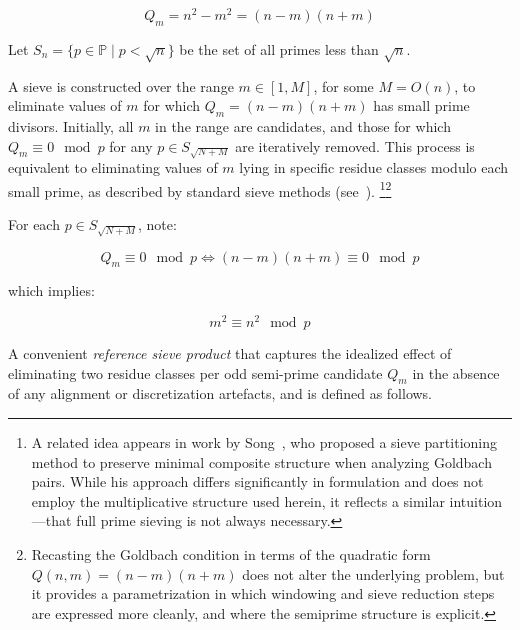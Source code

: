 \documentclass[11pt]{article}
\theoremstyle{inline}
\theoremstyle{break}
\theoremstyle{break}
\theoremstyle{break}
\theoremstyle{break}
\theoremstyle{break}
\theoremstyle{inline}
\begin{document}
\begin{equation}
Q_m = n^2 - m^2 = (n - m)(n + m)
\end{equation}

Let \( S_n = \{ p \in \mathbb{P} \mid p < \sqrt{n} \} \) be the set of all primes less than \( \sqrt{n} \).

A sieve is constructed over the range \( m \in [1, M] \), for some \( M = O(n) \), to eliminate values of \( m \) for which \( Q_m = (n - m)(n + m) \) has small prime divisors. Initially, all \( m \) in the range are candidates, and those for which \( Q_m \equiv 0 \mod p \) for any \( p \in S_{\sqrt{N+M}} \) are iteratively removed. This process is equivalent to eliminating values of \( m \) lying in specific residue classes modulo each small prime, as described by standard sieve methods (see~\cite{HalberstamRichert1974,IwaniecKowalski2004,FriedlanderIwaniec2010}).  \footnote{A related idea appears in work by Song~\cite{Song2008}, who proposed a sieve partitioning method to preserve minimal composite structure when analyzing Goldbach pairs. While his approach differs significantly in formulation and does not employ the multiplicative structure used herein, it reflects a similar intuition---that full prime sieving is not always necessary.}\footnote{Recasting the Goldbach condition in terms of the quadratic form \(Q(n,m)=(n-m)(n+m)\) does not alter the underlying problem, but it provides a parametrization in which windowing and sieve reduction steps are expressed more cleanly, and where the semiprime structure is explicit.}

For each \( p \in S_{\sqrt{N+M}} \), note:

\begin{equation}
Q_m \equiv 0 \mod p \iff (n - m)(n + m) \equiv 0 \mod p
\end{equation}

which implies:

\begin{equation}
m^2 \equiv n^2 \mod p
\end{equation}

A convenient \emph{reference sieve product} that captures the idealized effect of
eliminating two residue classes per odd semi-prime candidate \( Q_m \) in the absence of any
alignment or discretization artefacts, and is defined as follows.
\end{document}

